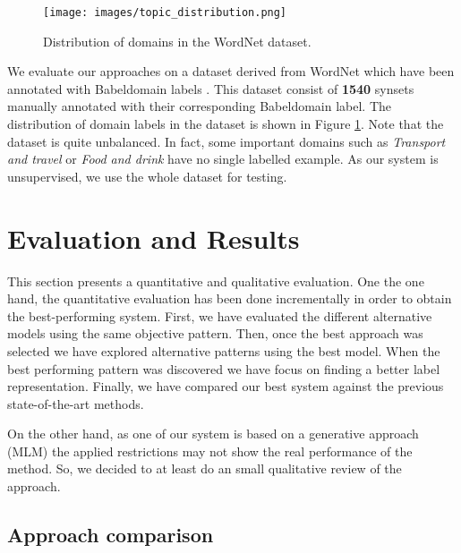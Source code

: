 \documentclass[11pt]{article}
\begin{document}
\begin{figure}
    \centering
    \texttt{[image: images/topic\_distribution.png]}
    \caption{Distribution of domains in the WordNet dataset.}
    \label{fig:wordnet_topic_distribution}
\end{figure}

We evaluate our approaches on a dataset derived from WordNet which have been annotated with Babeldomain labels \cite{camacho2016}. This dataset consist of \textbf{1540} synsets manually annotated with their corresponding Babeldomain label. The distribution of domain labels in the dataset is shown in Figure \ref{fig:wordnet_topic_distribution}. Note that the dataset is quite unbalanced. In fact, some important domains such as {\it Transport and travel} or {\it Food and drink} have no single labelled example. As our system is unsupervised, we use the whole dataset for testing.

\section{Evaluation and Results}
\label{evaluation-and-results}

This section presents a quantitative and qualitative evaluation. One the one hand, the quantitative evaluation has been done incrementally in order to obtain the best-performing system. First, we have evaluated the different alternative models using the same objective pattern. Then, once the best approach was selected we have explored alternative patterns using the best model. When the  best performing pattern was discovered we have focus on finding a better label representation. Finally, we have compared our best system against the previous state-of-the-art methods.


On the other hand, as one of our system is based on a generative approach (MLM) the applied restrictions may not show the real performance of the method. So, we decided to at least do an small qualitative review of the approach.

\subsection{Approach comparison}

\begin{table}[!t]
    \centering
    
    \caption{Top-K accuracy of different approaches.}
    \label{tab:approach}
\end{table}
\end{document}
